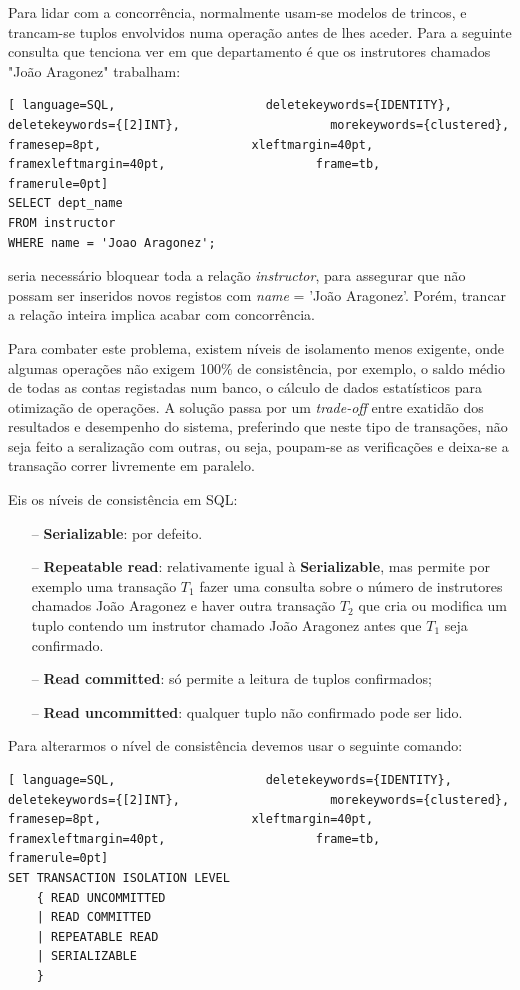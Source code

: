 \documentclass[oneside]{book}
\theoremstyle{definition}
\begin{document}
Para lidar com a concorrência, normalmente usam-se modelos de trincos, e trancam-se tuplos envolvidos numa operação antes de lhes aceder.
Para a seguinte consulta que tenciona ver em que departamento é que os instrutores chamados "João Aragonez" trabalham:
\begin{lstlisting}[ language=SQL,                     deletekeywords={IDENTITY},                     deletekeywords={[2]INT},                     morekeywords={clustered},                     framesep=8pt,                     xleftmargin=40pt,                     framexleftmargin=40pt,                     frame=tb,                     framerule=0pt]
SELECT dept_name
FROM instructor
WHERE name = 'Joao Aragonez';
\end{lstlisting}
seria necessário bloquear toda a relação \textit{instructor}, para assegurar que não possam ser inseridos novos registos com \textit{name} = 'João Aragonez'. Porém, trancar a relação inteira implica acabar com concorrência.

Para combater este problema, existem níveis de isolamento menos exigente, onde algumas operações não exigem 100\% de consistência, por exemplo, o saldo médio de todas as contas registadas num banco, o cálculo de dados estatísticos para otimização de operações. A solução passa por um \textit{trade-off} entre exatidão dos resultados e desempenho do sistema, preferindo que neste tipo de transações, não seja feito a seralização com outras, ou seja, poupam-se as verificações e deixa-se a transação correr livremente em paralelo.

Eis os níveis de consistência em SQL:
\begin{itemize}
    \itemsep0cm
    \item[--] \textbf{Serializable}: por defeito.
    \item[--] \textbf{Repeatable read}: relativamente igual à \textbf{Serializable}, mas permite por exemplo uma transação $T_1$ fazer uma consulta sobre o número de instrutores chamados João Aragonez e haver outra transação $T_2$ que cria ou modifica um tuplo contendo um instrutor chamado João Aragonez antes que $T_1$ seja confirmado.
    \item[--] \textbf{Read committed}: só permite a leitura de tuplos confirmados;
    \item[--] \textbf{Read uncommitted}: qualquer tuplo não confirmado pode ser lido.
\end{itemize}
Para alterarmos o nível de consistência devemos usar o seguinte comando:
\begin{lstlisting}[ language=SQL,                     deletekeywords={IDENTITY},                     deletekeywords={[2]INT},                     morekeywords={clustered},                     framesep=8pt,                     xleftmargin=40pt,                     framexleftmargin=40pt,                     frame=tb,                     framerule=0pt]
SET TRANSACTION ISOLATION LEVEL
    { READ UNCOMMITTED
    | READ COMMITTED
    | REPEATABLE READ
    | SERIALIZABLE
    }
\end{lstlisting}
\end{document}
